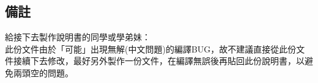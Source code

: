 \documentclass[12pt,a4paper]{report}
\begin{document}
\begin{CJK}{UTF8}{bkai}
\section{備註}
	給接下去製作說明書的同學或學弟妹：\\

此份文件由於「可能」出現無解(中文問題)的編譯BUG，故不建議直接從此份文件接續下去修改，最好另外製作一份文件，在編譯無誤後再貼回此份說明書，以避免兩頭空的問題。



\clearpage
\end{CJK}
\end{document}
